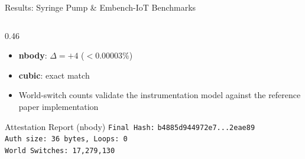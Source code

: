 \documentclass[aspectratio=169]{beamer}
\begin{document}
\begin{frame}{Results: Syringe Pump \& Embench-IoT Benchmarks}
\begin{columns}[T]
\begin{column}{0.46\textwidth}
  \smallskip
  \begin{itemize}\small
    \item \textbf{nbody}: $\Delta = +4$ \quad ($< 0.00003\%$)
    \item \textbf{cubic}: exact match
    \item World-switch counts validate the instrumentation
          model against the reference paper implementation
  \end{itemize}

  \bigskip
  \begin{block}{\small Attestation Report (nbody)}
    \footnotesize
    \texttt{Final Hash:}
    \texttt{b4885d944972e7...2eae89}\\
    \texttt{Auth size: 36 bytes, Loops: 0}\\
    \texttt{World Switches: 17,279,130}
  \end{block}
\end{column}

\end{columns}
\end{frame}
\end{document}
